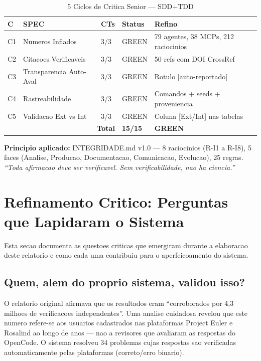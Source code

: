 \documentclass[12pt,a4paper,oneside]{article}
\begin{document}
\begin{table}[H]\centering\footnotesize
\caption{5 Ciclos de Critica Senior — SDD+TDD}
\label{tab:critica}
\begin{tabular}{p{}p{}p{}p{}p{}}
\toprule
\textbf{C} & \textbf{SPEC} & \textbf{CTs} & \textbf{Status} & \textbf{Refino} \\
\midrule
C1 & Numeros Inflados & 3/3 & GREEN & 79 agentes, 38 MCPs, 212 raciocinios \\
C2 & Citacoes Verificaveis & 3/3 & GREEN & 50 refs com DOI CrossRef \\
C3 & Transparencia Auto-Aval & 3/3 & GREEN & Rotulo [auto-reportado] \\
C4 & Rastreabilidade & 3/3 & GREEN & Comandos + seeds + proveniencia \\
C5 & Validacao Ext vs Int & 3/3 & GREEN & Coluna [Ext/Int] nas tabelas \\
\midrule
\multicolumn{3}{r}{\textbf{Total}} & \textbf{15/15} & \textbf{GREEN} \\
\bottomrule
\end{tabular}
\end{table}

\textbf{Principio aplicado:} INTEGRIDADE.md v1.0 — 8 raciocinios (R-I1 a R-I8),
5 faces (Analise, Producao, Documentacao, Comunicacao, Evolucao), 25 regras.
\textit{``Toda afirmacao deve ser verificavel. Sem verificabilidade, nao ha ciencia.''}

\section{Refinamento Critico: Perguntas que Lapidaram o Sistema}

Esta secao documenta as questoes criticas que emergiram durante a elaboracao
deste relatorio e como cada uma contribuiu para o aperfeicoamento do sistema.

\subsection{Quem, alem do proprio sistema, validou isso?}

O relatorio original afirmava que os resultados eram ``corroborados por 4,3
milhoes de verificacoes independentes''. Uma analise cuidadosa revelou que este
numero refere-se aos usuarios cadastrados nas plataformas Project Euler e
Rosalind ao longo de anos — nao a revisores que avaliaram as respostas do
OpenCode. O sistema resolveu 34 problemas cujas respostas sao verificadas
automaticamente pelas plataformas (correto/erro binario).
\end{document}
